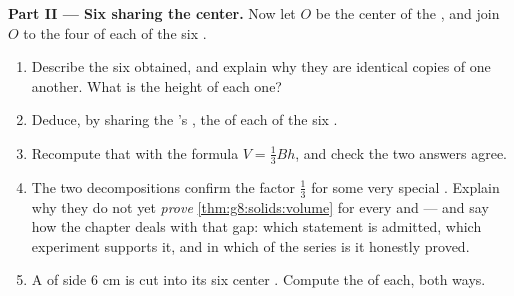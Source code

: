 \begin{problem}
\medskip
\noindent\textbf{Part II --- Six  sharing the center.}
Now let $O$ be the center of the , and join $O$ to the four
 of each of the six .
\begin{enumerate}[resume]
  \item Describe the six  obtained, and explain why they
        are identical copies of one another. What is the height
        of each one?
  \item Deduce, by sharing the 's , the  of each
        of the six .
  \item Recompute that  with the formula
        $V = \frac13 B h$, and check the two answers agree.
  \item The two decompositions confirm the factor $\frac13$ for
        some very special . Explain why they do not yet
        \emph{prove} \cref{thm:g8:solids:volume} for every
         and  --- and say how the chapter deals with
        that gap: which statement is admitted, which experiment
        supports it, and in which  of the series is it
        honestly proved.
  \item A  of side $6$ cm is cut into its six center
        . Compute the  of each, both ways.
\end{enumerate}


\end{problem}
